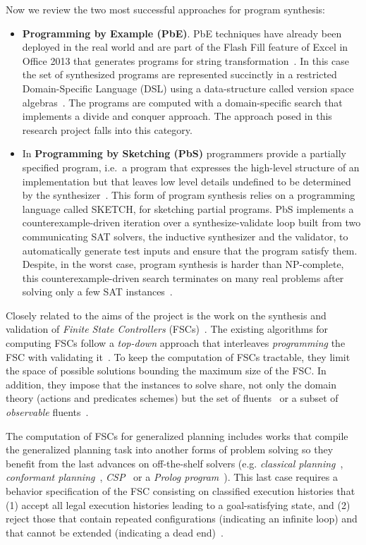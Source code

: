 \documentclass[10pt,a4paper]{paper}
\begin{document}
Now we review the two most successful approaches for program synthesis:
\begin{itemize}
\item{\bf Programming by Example (PbE)}. PbE techniques have already been deployed in the real world and are part of the {\sc Flash Fill} feature of Excel in Office 2013 that generates programs for string transformation~\cite{gulwani2011automating}. In this case the set of synthesized programs are represented succinctly in a restricted Domain-Specific Language (DSL) using a data-structure called version space algebras~\cite{mitchell1982generalization}. The programs are computed with a domain-specific search that implements a divide and conquer approach. The approach posed in this research project falls into this category.

\item In {\bf Programming by Sketching (PbS)} programmers provide a partially specified program, i.e.~a program that expresses the high-level structure of an implementation but that leaves low level details undefined to be determined by the synthesizer~\cite{solar2006combinatorial}. This form of program synthesis relies on a programming language called {\sc SKETCH}, for sketching partial programs. PbS implements a counterexample-driven iteration over a synthesize-validate loop built from two communicating SAT solvers, the inductive synthesizer and the validator, to automatically generate test inputs and ensure that the program satisfy them. Despite, in the worst case, program synthesis is harder than NP-complete, this counterexample-driven search terminates on many real problems after solving only a few SAT instances~\cite{lake2015human}.
\end{itemize}

Closely related to the aims of the project is the work on the synthesis and validation of {\it Finite State Controllers} (FSCs)~\cite{geffner:policies:IJCAI15}. The existing algorithms for computing FSCs follow a {\it top-down} approach that interleaves {\it programming} the FSC with validating it~\cite{sergio:aprograming:ijcai16}. To keep the computation of FSCs tractable, they limit the space of possible solutions bounding the maximum size of the FSC. In addition, they impose that the instances to solve share, not only the domain theory (actions and predicates schemes) but the set of fluents~\cite{sergio:aprograming:icaps16} or a subset of {\it observable} fluents~\cite{Geffner:FSM:AAAI10}.

The computation of FSCs for generalized planning includes works that compile the generalized planning task into another forms of problem solving so they benefit from the last advances on off-the-shelf solvers (e.g. {\em classical planning}~\cite{sergio:aprograming:icaps16}, {\em conformant planning}~\cite{Geffner:FSM:AAAI10}, {\em CSP}~\cite{Infantes:FSC:ECAI2010} or a {\em Prolog program}~\cite{Giacomo:FSM:ICAPS13}). This last case requires a behavior specification of the FSC consisting on classified execution histories that (1) accept all legal execution histories leading to a goal-satisfying state, and (2) reject those that contain repeated configurations (indicating an infinite loop) and that cannot be extended (indicating a dead end)~\cite{Giacomo:FSM:ICAPS13}.
\end{document}
